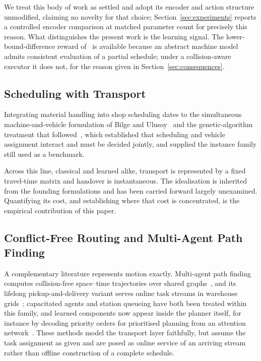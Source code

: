 We treat this body of work as settled and adopt its encoder and action
structure unmodified, claiming no novelty for that choice;
Section~\ref{sec:experiments} reports a controlled encoder comparison at
matched parameter count for precisely this reason. What distinguishes the
present work is the learning signal. The lower-bound-difference reward
of~\cite{zhang2020l2d} is available because an abstract machine model admits
consistent evaluation of a partial schedule; under a collision-aware
executor it does not, for the reason given in
Section~\ref{sec:consequences}.

\subsection{Scheduling with Transport}

Integrating material handling into shop scheduling dates to the simultaneous
machine-and-vehicle formulation of Bilge and Ulusoy~\cite{bilge1995time} and
the genetic-algorithm treatment that followed~\cite{ulusoy1997ga}, which
established that scheduling and vehicle assignment interact and must be
decided jointly, and supplied the instance family still used as a benchmark.

Across this line, classical and learned alike, transport is represented by a
fixed travel-time matrix and handover is instantaneous. The idealisation is
inherited from the founding formulations and has been carried forward
largely unexamined. Quantifying its cost, and establishing where that cost
is concentrated, is the empirical contribution of this paper.

\subsection{Conflict-Free Routing and Multi-Agent Path Finding}

A complementary literature represents motion exactly. Multi-agent path
finding computes collision-free space--time trajectories over shared
graphs~\cite{stern2019mapf}, and its lifelong pickup-and-delivery variant
serves online task streams in warehouse grids~\cite{ma2017lifelong};
capacitated agents and station queueing have both been treated within this
family, and learned components now appear inside the planner itself, for
instance by decoding priority orders for prioritised planning from an
attention network~\cite{rlrhpp2026}. These methods model the transport layer
faithfully, but assume the task assignment as given and are posed as online
service of an arriving stream rather than offline construction of a complete
schedule.

